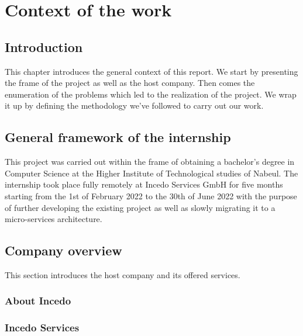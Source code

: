\chapter{Context of the work}
\newpage

\setcounter{secnumdepth}{0} %
\section{Introduction}
This chapter introduces the general context of this report. We start by presenting the frame of the project as well as the host company. Then comes the enumeration of the problems which led to the realization of the project. We wrap it up by defining the methodology we’ve followed to carry out our work. \citep{test1}

\setcounter{secnumdepth}{2} %
\section{General framework of the internship}
This project was carried out within the frame of obtaining a bachelor’s degree in Computer Science at the Higher Institute of Technological studies of Nabeul. The internship took place fully remotely at Incedo Services GmbH for five months starting from the 1st of February 2022 to the 30th of June 2022 with the purpose of further developing the existing project as well as slowly migrating it to a micro-services architecture. \cite{test2}

\section{Company overview}
This section introduces the host company and its offered services.
\subsection{About Incedo}
\subsection{Incedo Services}

